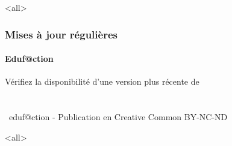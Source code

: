 \documentclass[ignorenonframetext,allowframebreaks,aspectratio=169,t,9pt, xcolor=table,c]{beamer}
\begin{document}
\mode<all>{}
\begin{frame}[plain]
\frametitle{Mises à jour régulières}
\framesubtitle{Eduf@ction~\umaila}
{\begin{center} 
{Vérifiez la disponibilité d'une version plus récente de} \\
{ }   \\ 
{{\huge\ccbyncndeu}}  \\  
{\the\year~eduf@ction - Publication en Creative Common BY-NC-ND }    \\  %
{\safeqrcode[padding]{\GITfilename}}  
\end{center} }
\end{frame}

  \mode<all>{\immediate\closeout\audioexport}
\end{document}

